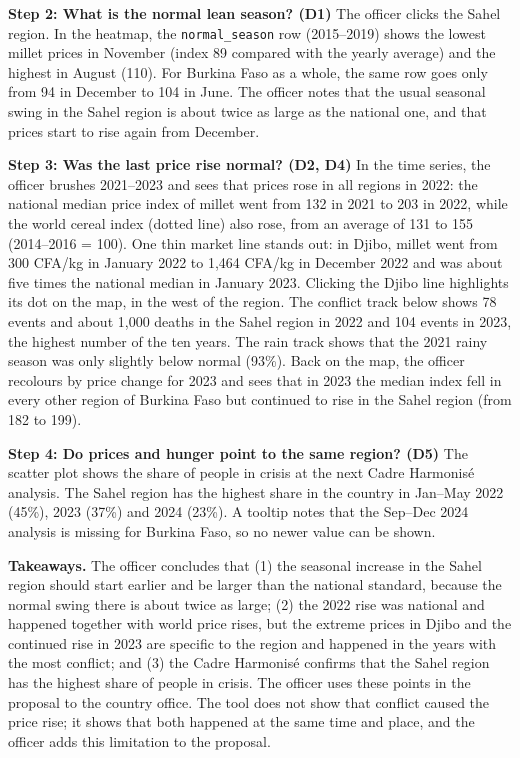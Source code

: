 \documentclass{article}
\begin{document}
\textbf{Step 2: What is the normal lean season? (D1)} The officer clicks the Sahel region. In the heatmap, the \texttt{normal\_season} row (2015--2019) shows the lowest millet prices in November (index 89 compared with the yearly average) and the highest in August (110). For Burkina Faso as a whole, the same row goes only from 94 in December to 104 in June. The officer notes that the usual seasonal swing in the Sahel region is about twice as large as the national one, and that prices start to rise again from December.

\textbf{Step 3: Was the last price rise normal? (D2, D4)} In the time series, the officer brushes 2021--2023 and sees that prices rose in all regions in 2022: the national median price index of millet went from 132 in 2021 to 203 in 2022, while the world cereal index (dotted line) also rose, from an average of 131 to 155 (2014--2016 = 100). One thin market line stands out: in Djibo, millet went from 300 CFA/kg in January 2022 to 1,464 CFA/kg in December 2022 and was about five times the national median in January 2023. Clicking the Djibo line highlights its dot on the map, in the west of the region. The conflict track below shows 78 events and about 1,000 deaths in the Sahel region in 2022 and 104 events in 2023, the highest number of the ten years. The rain track shows that the 2021 rainy season was only slightly below normal (93\%). Back on the map, the officer recolours by price change for 2023 and sees that in 2023 the median index fell in every other region of Burkina Faso but continued to rise in the Sahel region (from 182 to 199).

\textbf{Step 4: Do prices and hunger point to the same region? (D5)} The scatter plot shows the share of people in crisis at the next Cadre Harmonis\'e analysis. The Sahel region has the highest share in the country in Jan--May 2022 (45\%), 2023 (37\%) and 2024 (23\%). A tooltip notes that the Sep--Dec 2024 analysis is missing for Burkina Faso, so no newer value can be shown.

\textbf{Takeaways.} The officer concludes that (1) the seasonal increase in the Sahel region should start earlier and be larger than the national standard, because the normal swing there is about twice as large; (2) the 2022 rise was national and happened together with world price rises, but the extreme prices in Djibo and the continued rise in 2023 are specific to the region and happened in the years with the most conflict; and (3) the Cadre Harmonis\'e confirms that the Sahel region has the highest share of people in crisis. The officer uses these points in the proposal to the country office. The tool does not show that conflict caused the price rise; it shows that both happened at the same time and place, and the officer adds this limitation to the proposal.
\end{document}
